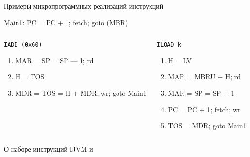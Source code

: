 \begin{frame}{Примеры микропрограммных реализаций инструкций}
    \ttfamily\small

\pause
    Main1: PC = PC + 1; fetch; goto (MBR)

\begin{columns}
        \column{5.5cm}

    \pause
    \begin{block}{\texttt{IADD (0x60)}}
    \begin{enumerate}
        \item MAR = SP = SP — 1; rd
        \item H = TOS
        \item MDR = TOS = H + MDR; wr; goto Main1
    \end{enumerate}
    \end{block}

        \column{5.5cm}
    \pause
    \begin{block}{\texttt{ILOAD k}}
    \begin{enumerate}
        \item H = LV
        \item MAR = MBRU + H; rd
        \item MAR = SP = SP + 1
        \item PC = PC + 1; fetch; wr
        \item TOS = MDR; goto Main1
    \end{enumerate}
    \end{block}

\end{columns}
\end{frame}

\begin{frame}{О наборе инструкций IJVM и }

\begin{columns}
        \column{4cm}

        \column{9cm}

\end{columns}
\end{frame}



